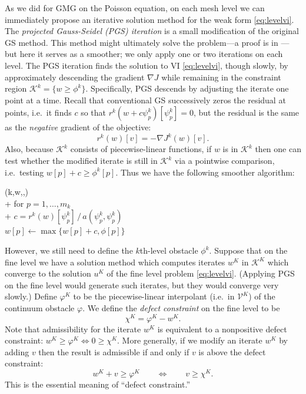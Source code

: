 \documentclass[letterpaper,final,12pt,reqno]{amsart}
\newcommand{\grad}{\nabla}
\numberwithin{equation}{section}
\numberwithin{figure}{section}
\numberwithin{table}{section}
\begin{document}
As we did for GMG on the Poisson equation, on each mesh level we can immediately propose an iterative solution method for the weak form \eqref{eq:levelvi}.  The \emph{projected Gauss-Seidel (PGS) iteration} is a small modification of the original GS method.  This method might ultimately solve the problem---a proof is in \cite{BrandtCryer1983}---but here it serves as a smoother; we only apply one or two iterations on each level.  The PGS iteration finds the solution to VI \eqref{eq:levelvi}, though slowly, by approximately descending the gradient $\grad J$ while remaining in the constraint region $\mathcal{K}^k = \{w\ge \phi^k\}$.  Specifically, PGS descends by adjusting the iterate one point at a time.  Recall that conventional GS successively zeros the residual at points, i.e.~it finds $c$ so that $r^k(w+c\psi_p^k)[\psi_p^k]=0$, but the residual is the same as the \emph{negative} gradient of the objective:
\begin{equation}
  r^k(w)[v] = - \grad J^k(w)[v].  \label{eq:levelresidualgradient}
\end{equation}
Also, because $\mathcal{K}^k$ consists of piecewise-linear functions, if $w$ is in $\mathcal{K}^k$ then one can test whether the modified iterate is still in $\mathcal{K}^k$ via a pointwise comparison, i.e.~testing $w[p] + c \ge \phi^k[p]$.  Thus we have the following smoother algorithm:
\begin{pseudo*}
(k,w,\ell,\phi)\text{:} \\+
    for $p=1,\dots,m_k$ \\+
        $\displaystyle c = r^k(w)[\psi_p^k] \, \big/ \,a(\psi_p^k,\psi_p^k)$ \qquad {} \\
        $w[p] \gets \max\{w[p] + c,\phi[p]\}$
\end{pseudo*}

However, we still need to define the $k$th-level obstacle $\phi^k$.  Suppose that on the fine level we have a solution method which computes iterates $w^K$ in $\mathcal{K}^K$ which converge to the solution $u^K$ of the fine level problem \eqref{eq:levelvi}.  (Applying PGS on the fine level would generate such iterates, but they would converge very slowly.)  Define $\varphi^K$ to be the piecewise-linear interpolant (i.e.~in $\mathcal{V}^K$) of the continuum obstacle $\varphi$.  We define the \emph{defect constraint} \cite{GraeserKornhuber2009} on the fine level to be
\begin{equation}
  \chi^K = \varphi^K - w^K.  \label{eq:defectconstraint}
\end{equation}
Note that admissibility for the iterate $w^K$ is equivalent to a nonpositive defect constraint: $w^K \ge \varphi^K \iff 0 \ge \chi^K$.  More generally, if we modify an iterate $w^K$ by adding $v$ then the result is admissible if and only if $v$ is above the defect constraint:
\begin{equation}
  w^K + v \ge \varphi^K  \qquad \iff \qquad v \ge \chi^K.  \label{eq:defectmeaning}
\end{equation}
This is the essential meaning of ``defect constraint.''
\end{document}
